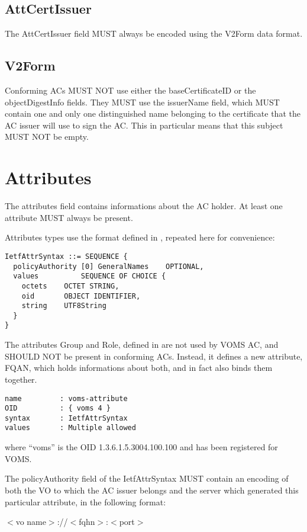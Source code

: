 \documentclass[a4]{article}
\begin{document}
\subsection{AttCertIssuer} 
The AttCertIssuer field MUST always be encoded using the V2Form data
format.

\subsection{V2Form}
Conforming ACs MUST NOT use either the baseCertificateID or the
objectDigestInfo fields. They MUST use the issuerName field, which
MUST contain one and only one distinguished name belonging to the
certificate that the AC issuer will use to sign the AC. This in
particular means that this subject MUST NOT be empty.

\section{Attributes}
The attributes field contains informations about the AC holder.  At
least one attribute MUST always be present. 

Attributes types use the format defined in \cite{rfc3281}, repeated here
for convenience:

\begin{verbatim}
IetfAttrSyntax ::= SEQUENCE {
  policyAuthority [0] GeneralNames    OPTIONAL,
  values          SEQUENCE OF CHOICE {
    octets    OCTET STRING,
    oid       OBJECT IDENTIFIER,
    string    UTF8String
  }
}
\end{verbatim}

The attributes Group and Role, defined in \cite{rfc3281} are not used by
VOMS AC, and SHOULD NOT be present in conforming ACs.  Instead, it
defines a new attribute, FQAN, which holds informations about both,
and in fact also binds them together.

\begin{verbatim}
name         : voms-attribute
OID          : { voms 4 }
syntax       : IetfAttrSyntax
values       : Multiple allowed
\end{verbatim}

where ``voms'' is the OID 1.3.6.1.5.3004.100.100 and has been
registered for VOMS.

The policyAuthority field of the IetfAttrSyntax MUST contain an
encoding of both the VO to which the AC issuer belongs and the server
which generated this particular attribute, in the following format:

\begin{center}
$<$vo name$>$://$<$fqhn$>$:$<$port$>$
\end{center}
\end{document}
